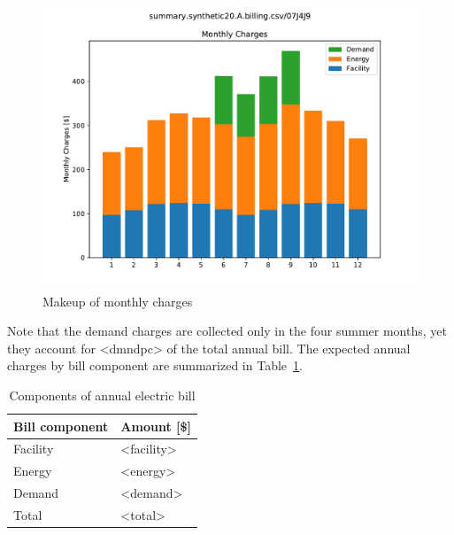 \documentclass[11pt]{article}
\begin{document}
\begin{figure}[!h]
\centering
\includegraphics[width=\columnwidth, page=1, trim=0in 0.45in 0in 0.45in, clip]{visuals/synthetic20.A.boxplots.pdf}
\caption{Makeup of monthly charges}
\label{fig:bars}
\end{figure}

Note that the demand charges are collected only in the four summer months, yet they account for <dmndpc> of the total annual bill. The expected annual charges by bill component are summarized in Table~\ref{tab:annual}.

\begin{table}[h!]
  \centering
  \caption{Components of annual electric bill}
  \vspace{1.5ex}
  \label{tab:annual}
  \begin{tabular}{ll}
    Bill component & Amount [\$] \\
    \midrule
    Facility & <facility> \\
    Energy & <energy> \\
    Demand & <demand> \\
    \midrule
    Total & <total>
  \end{tabular}
\end{table}
\clearpage

\pagestyle{energy}
\end{document}
